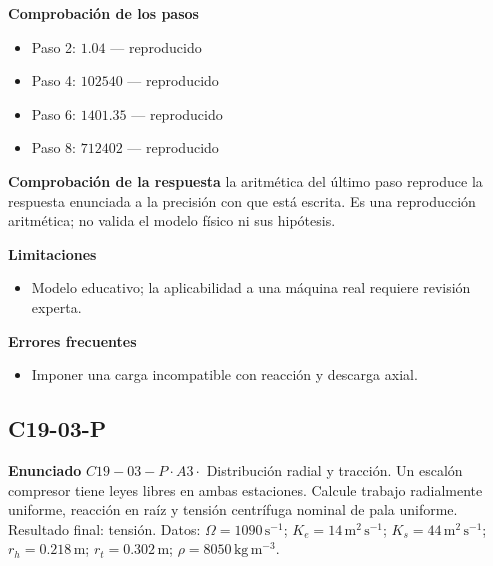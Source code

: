 \documentclass[10pt,openany]{book}
\begin{document}
\noindent\textbf{Comprobación de los pasos}
\begin{itemize}
\item Paso 2: $1.04$ — reproducido
\item Paso 4: $102540$ — reproducido
\item Paso 6: $1401.35$ — reproducido
\item Paso 8: $712402$ — reproducido
\end{itemize}

\noindent\textbf{Comprobación de la respuesta} la aritmética del último paso reproduce la respuesta enunciada a la precisión con que está escrita. Es una reproducción aritmética; no valida el modelo físico ni sus hipótesis.

\noindent\textbf{Limitaciones}
\begin{itemize}
\item Modelo educativo; la aplicabilidad a una máquina real requiere revisión experta.
\end{itemize}

\noindent\textbf{Errores frecuentes}
\begin{itemize}
\item Imponer una carga incompatible con reacción y descarga axial.
\end{itemize}
\begin{center}\end{center}
\subsection*{C19-03-P}

\noindent\textbf{Enunciado}
\(C19-03-P \cdot A3 \cdot\) Distribución radial y tracción. Un escalón compresor tiene leyes libres en ambas estaciones. Calcule trabajo radialmente uniforme, reacción en raíz y tensión centrífuga nominal de pala uniforme. Resultado final: tensión. Datos: \(\Omega=1090\, \mathrm{s}^{-1}\); \(K_e=14\, \mathrm{m}^{2}\,\mathrm{s}^{-1}\); \(K_s=44\, \mathrm{m}^{2}\,\mathrm{s}^{-1}\); \(r_h=0.218\, \mathrm{m}\); \(r_t=0.302\, \mathrm{m}\); \(\rho=8050\, \mathrm{kg}\,\mathrm{m}^{-3}\).
\end{document}
